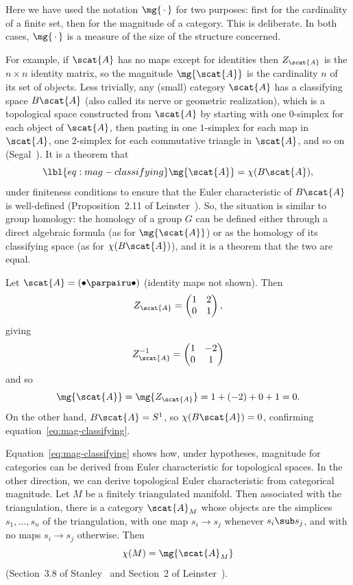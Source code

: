 Here we have used the notation $\mg{\,\cdot\,}$ for two purposes: first for
the cardinality of a finite set, then for the magnitude of a category.
This is deliberate.  In both cases, $\mg{\,\cdot\,}$ is a measure
of the size of the structure concerned.

For example, if $\scat{A}$ has no maps except for identities then
$Z_{\scat{A}}$ is the $n \times n$ identity matrix, so the magnitude
$\mg{\scat{A}}$ is the cardinality $n$ of its set of objects.  Less
trivially, any (small) category $\scat{A}$ has a classifying%
% 
% 
space $B\scat{A}$ (also called its nerve 
or geometric%
%
% 
realization), which is a topological space constructed from $\scat{A}$ by
starting with one $0$-simplex for each object of $\scat{A}$, then pasting
in one $1$-simplex for each map in $\scat{A}$, one $2$-simplex for each
commutative triangle in $\scat{A}$, and so on (Segal~\cite{SegaCSS}).  It is a
theorem that
% 
\begin{equation}
\lbl{eq:mag-classifying}
\mg{\scat{A}} = \chi(B\scat{A}),
\end{equation}
% 
under finiteness conditions to ensure that the Euler%
%
%
characteristic of $B\scat{A}$ is well-defined
(Proposition~2.11 of Leinster~\cite{ECC}).  So, the situation is similar to
group homology: the homology of a group $G$ can be
defined either through a direct algebraic formula (as for $\mg{\scat{A}}$)
or as the homology of its classifying space (as for $\chi(B\scat{A})$), and
it is a theorem that the two are equal.

\begin{example}
Let $\scat{A} = (\bullet \parpairu \bullet)$ (identity maps not shown).
Then  
\[
Z_{\scat{A}} 
= 
\begin{pmatrix}
1       &2      \\
0       &1  
\end{pmatrix},
\]
giving
\[
Z_{\scat{A}}^{-1}
=
\begin{pmatrix}
1       &-2     \\
0       &1  
\end{pmatrix}
\]
and so
\[
\mg{\scat{A}}
=
\mg{Z_{\scat{A}}}
=
1 + (-2) + 0 + 1
=
0.
\]
On the other hand, $B\scat{A} = S^1$, so $\chi(B\scat{A}) = 0$,
confirming equation~\eqref{eq:mag-classifying}.
\end{example}

Equation~\eqref{eq:mag-classifying} shows how, under hypotheses, magnitude
for categories can be derived from Euler%
%
% 
characteristic for topological spaces.  In the other direction, we can
derive topological Euler characteristic from categorical magnitude.  Let
$M$ be a finitely triangulated manifold.  Then associated with the
triangulation, there is a category $\scat{A}_M$ whose objects are the
simplices $s_1, \ldots, s_n$ of the triangulation, with one map $s_i \to
s_j$ whenever $s_i \sub s_j$, and with no maps $s_i \to s_j$ otherwise.
Then
\[
\chi(M) = \mg{\scat{A}_M}
\]
(Section~3.8 of Stanley~\cite{StanEC1} and Section~2 of
Leinster~\cite{ECC}).

